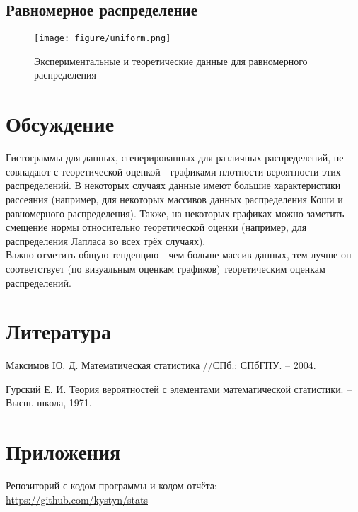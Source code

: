 \subsection{Равномерное распределение}


\begin{figure}
	\begin{center}
		\texttt{[image: figure/uniform.png]}
		\caption{Экспериментальные и теоретические данные для равномерного распределения} 
		\label{pic:pic_name}
	\end{center}
\end{figure}


\section{Обсуждение}
Гистограммы для данных, сгенерированных для различных распределений, не совпадают с теоретической оценкой - графиками плотности вероятности этих распределений. В некоторых случаях данные имеют большие характеристики рассеяния (например, для некоторых массивов данных распределения Коши и равномерного распределения). Также, на некоторых графиках можно заметить смещение нормы относительно теоретической оценки (например, для распределения Лапласа во всех трёх случаях). 
\\
Важно отметить общую тенденцию - чем больше массив данных, тем лучше он соответствует (по визуальным оценкам графиков) теоретическим оценкам распределений.




\section{Литература}
Максимов Ю. Д. Математическая статистика //СПб.: СПбГПУ. – 2004.

Гурский Е. И. Теория вероятностей с элементами математической статистики. – Высш. школа, 1971.

\section{Приложения}

Репозиторий с кодом программы и кодом отчёта: \href{https://github.com/kystyn/stats}{https://github.com/kystyn/stats}



